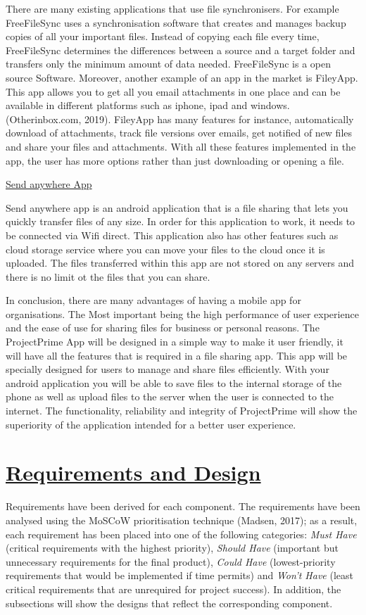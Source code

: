 \documentclass{article}
\begin{document}
There are many existing applications that use file synchronisers. For example FreeFileSync uses a synchronisation software that creates and manages backup copies of all your important files. Instead of copying each file every time, FreeFileSync determines the differences between a source and a target folder and transfers only the minimum amount of data needed. FreeFileSync is a open source Software. Moreover, another example of an app in the market is FileyApp. This app allows you to get all you email attachments in one place and can be available in different platforms such as iphone, ipad and windows. (Otherinbox.com, 2019).  FileyApp has many features for instance, automatically download of attachments, track file versions over emails, get notified of new files and share your files and attachments. With all these features implemented in the app, the user has more options rather than just downloading or opening a file. 

\underline{Send anywhere App}

Send anywhere app is an android application that  is a file sharing that lets you quickly transfer files of any size. In order for this application to work, it needs to be connected via Wifi direct. This application also has other features such as cloud storage service where you can move your files to the cloud once it is uploaded. The files transferred within this app are not stored on any servers and there is no limit ot the files that you can share. 

In conclusion, there are many advantages of having a mobile app for organisations. The Most important being the high performance of user experience and the ease of use for sharing files for business or personal reasons. The ProjectPrime App will be designed in a simple way to make it user friendly, it will have all the features that is required in a file sharing app. This app will be specially designed for users to manage and share files efficiently. With your android application you will be able to save files to the internal storage of the phone as well as upload files to the server when the user is connected to the internet. The functionality, reliability and integrity of ProjectPrime will show the superiority of the application intended for a better user experience. 

\section{\underline{Requirements and Design}}
Requirements have been derived for each component. The requirements have been analysed using the MoSCoW prioritisation technique (Madsen, 2017); as a result, each requirement has been placed into one of the following categories: \textit{Must Have} (critical requirements with the highest priority), \textit{Should Have} (important but unnecessary requirements for the final product), \textit{Could Have} (lowest-priority requirements that would be implemented if time permits) and \textit{Won't Have} (least critical requirements that are unrequired for project success). In addition, the subsections will show the designs that reflect the corresponding component.
\end{document}
